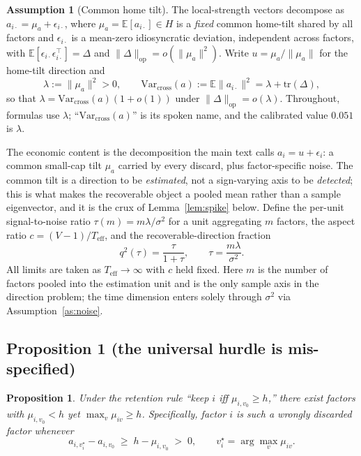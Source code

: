 \documentclass[12pt]{article}
\theoremstyle{plain}
\newtheorem{proposition}{Proposition}
\theoremstyle{definition}
\newtheorem{assumption}{Assumption}
\newcommand{\E}{\mathbb{E}}
\newcommand{\Var}{\mathrm{Var}}
\newcommand{\tr}{\mathrm{tr}}
\begin{document}
\begin{assumption}[Common home tilt]
\label{as:spike}
The local-strength vectors decompose as $a_{i\cdot}=\mu_a+\epsilon_{i\cdot}$,
where $\mu_a=\E[a_{i\cdot}]\in H$ is a \emph{fixed} common home-tilt shared by all
factors and $\epsilon_{i\cdot}$ is a mean-zero idiosyncratic deviation,
independent across factors, with $\E[\epsilon_{i\cdot}\epsilon_{i\cdot}^\top]
=\Delta$ and $\|\Delta\|_{\mathrm{op}}=o(\|\mu_a\|^2)$. Write $u=\mu_a/\|\mu_a\|$
for the home-tilt direction and
\[
\lambda:=\|\mu_a\|^2>0,\qquad
\Var_{\mathrm{cross}}(a):=\E\|a_{i\cdot}\|^2=\lambda+\tr(\Delta),
\]
so that $\lambda=\Var_{\mathrm{cross}}(a)(1+o(1))$ under $\|\Delta\|_{\mathrm{op}}
=o(\lambda)$. Throughout, formulas use $\lambda$; ``$\Var_{\mathrm{cross}}(a)$''
is its spoken name, and the calibrated value $0.051$ is $\lambda$.
\end{assumption}

\noindent The economic content is the decomposition the main text calls
$a_i=u+\epsilon_i$: a common small-cap tilt $\mu_a$ carried by every discard, plus
factor-specific noise. The common tilt is a direction to be \emph{estimated}, not
a sign-varying axis to be \emph{detected}; this is what makes the recoverable
object a pooled mean rather than a sample eigenvector, and it is the crux of
Lemma~\ref{lem:spike} below. Define the per-unit signal-to-noise ratio
$\tau(m)=m\lambda/\sigma^2$ for a unit aggregating $m$ factors, the aspect ratio
$c=(V-1)/T_{\text{eff}}$, and the recoverable-direction fraction
\[
q^2(\tau)=\frac{\tau}{1+\tau},\qquad \tau=\frac{m\lambda}{\sigma^2}.
\]
All limits are taken as $T_{\text{eff}}\to\infty$ with $c$ held fixed. Here $m$ is
the number of factors pooled into the estimation unit and is the only sample axis
in the direction problem; the time dimension enters solely through
$\sigma^2$ via Assumption~\ref{as:noise}.

\subsection{Proposition 1 (the universal hurdle is mis-specified)}

\begin{proposition}
Under the retention rule ``keep $i$ iff $\mu_{i,v_0}\ge h$,'' there exist factors
with $\mu_{i,v_0}<h$ yet $\max_v\mu_{iv}\ge h$. Specifically, factor $i$ is such
a wrongly discarded factor whenever
\[
a_{i,v^\star_i}-a_{i,v_0}\;\ge\;h-\mu_{i,v_0}\;>\;0,
\qquad v^\star_i=\arg\max_v\mu_{iv}.
\]
\end{proposition}
\end{document}
